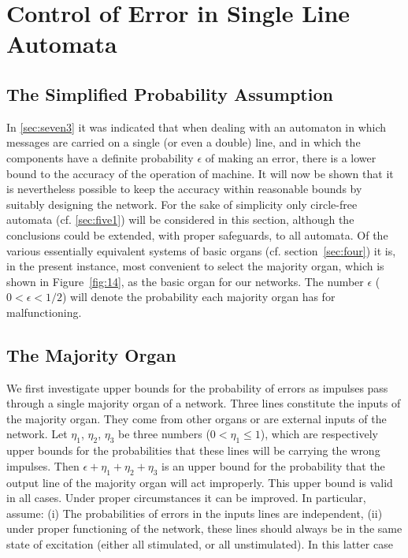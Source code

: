 \documentclass[twocolumn,preprintnumbers,amsmath,amssymb,floatfix]{revtex4}
\begin{document}
\section{\label{sec:eight}Control of Error in Single Line Automata}

\subsection{\label{sec:eight1}The Simplified Probability Assumption}

In \ref{sec:seven3} it was indicated that when dealing with an
automaton in which messages are carried on a single (or even a
double) line, and in which the components have a definite
probability $\epsilon$ of making an error, there is a lower bound
to the accuracy of the operation of machine. It will now be shown
that it is nevertheless possible to keep the accuracy within
reasonable bounds by suitably designing the network. For the sake
of simplicity only circle-free automata (cf. \ref{sec:five1}) will
be considered in this section, although the conclusions could be
extended, with proper safeguards, to all automata. Of the various
essentially equivalent systems of basic organs (cf.
section~\ref{sec:four}) it is, in the present instance, most
convenient to select the majority organ, which is shown in
Figure~\ref{fig:14}, as the basic organ for our networks. The
number $\epsilon$ ($0<\epsilon<1/2$) will denote the probability
each majority organ has for malfunctioning.

\subsection{\label{sec:eight2}The Majority Organ}

We first investigate upper bounds for the probability of errors as
impulses pass through a single majority organ of a network. Three
lines constitute the inputs of the majority organ. They come from
other organs or are external inputs of the network. Let $\eta_1$,
$\eta_2$, $\eta_3$ be three numbers ($0<\eta_1\leq 1$), which are
respectively upper bounds for the probabilities that these lines
will be carrying the wrong impulses. Then $\epsilon + \eta_1 +
\eta_2 + \eta_3$ is an upper bound for the probability that the
output line of the majority organ will act improperly. This upper
bound is valid in all cases. Under proper circumstances it can be
improved. In particular, assume: (i) The probabilities of errors
in the inputs lines are independent, (ii) under proper functioning
of the network, these lines should always be in the same state of
excitation (either all stimulated, or all unstimulated). In this
latter case
\end{document}
